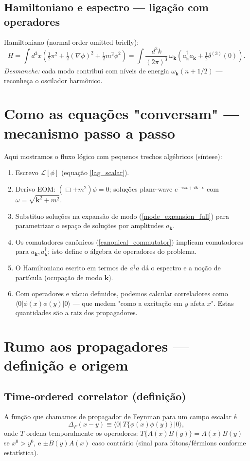 \documentclass[12pt,a4paper]{article}
\begin{document}
\subsection{Hamiltoniano e espectro — ligação com operadores}
Hamiltoniano (normal-order omitted briefly):
\[ H = \int d^3x \left(\tfrac12\pi^2 + \tfrac12(\nabla\phi)^2 + \tfrac12 m^2\phi^2\right) = \int\frac{d^3k}{(2\pi)^3}\,\omega_{\mathbf{k}}\left(a^\dagger_{\mathbf{k}}a_{\mathbf{k}}+\tfrac12\delta^{(3)}(0)\right).\]
\textit{Desmanche:} cada modo contribui com níveis de energia $\omega_{\mathbf{k}}(n+1/2)$ — reconheça o oscilador harm\^onico.

\section{Como as equações "conversam" — mecanismo passo a passo}
Aqui mostramos o fluxo lógico com pequenos trechos algébricos (síntese):
\begin{enumerate}
  \item Escrevo $\mathcal{L}[\phi]$ (equação \ref{lag_scalar}).
  \item Derivo EOM: $(\Box+m^2)\phi=0$; soluções plane-wave $e^{-i\omega t+i\mathbf{k}\cdot\mathbf{x}}$ com $\omega=\sqrt{\mathbf{k}^2+m^2}$.
  \item Substituo soluções na expansão de modo (\ref{mode_expansion_full}) para parametrizar o espaço de soluções por amplitudes $a_{\mathbf{k}}$.
  \item Os comutadores canônicos (\ref{canonical_commutator}) implicam comutadores para $a_{\mathbf{k}},a^\dagger_{\mathbf{k}}$; isto define o álgebra de operadores do problema.
  \item O Hamiltoniano escrito em termos de $a^\dagger a$ dá o espectro e a noção de partícula (ocupação de modo $\mathbf{k}$).
  \item Com operadores e vácuo definidos, podemos calcular correladores como $\langle0|\phi(x)\phi(y)|0\rangle$ — que medem "como a excitação em $y$ afeta $x$". Estas quantidades são a raiz dos propagadores.
\end{enumerate}

\section{Rumo aos propagadores — definição e origem}
\subsection{Time-ordered correlator (defini\c{c}\~ao)}
A função que chamamos de propagador de Feynman para um campo escalar é
\begin{equation}\label{feynman_def}
\Delta_F(x-y) \equiv \langle0|\,T\{\phi(x)\phi(y)\}\,|0\rangle,
\end{equation}
onde $T$ ordena temporalmente os operadores: $T\{A(x)B(y)\}=A(x)B(y)$ se $x^0>y^0$, e $\pm B(y)A(x)$ caso contrário (sinal para fótons/férmions conforme estatística).
\end{document}
